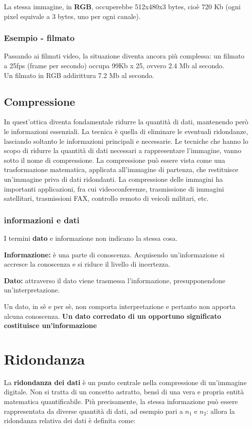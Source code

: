 La stessa immagine, in \textbf{RGB}, occuperebbe 512x480x3 bytes, cioè 720 Kb (ogni pixel equivale a 3 bytes, uno per ogni canale).

\subsubsection*{Esempio - filmato}
Passando ai filmati video, la situazione diventa ancora più complessa: un filmato a 25fps (frame per secondo) occupa 99Kb x 25, ovvero 2.4 Mb al secondo.
\\Un filmato in RGB addirittura 7.2 Mb al secondo.

\subsection{Compressione}
In quest'ottica diventa fondamentale ridurre la quantità di dati, mantenendo però le informazioni essenziali. La tecnica è quella di
eliminare le eventuali ridondanze, lasciando soltanto le informazioni principali e necessarie.
Le tecniche che hanno lo scopo di ridurre la quantità di dati necessari a rappresentare l'immagine, vanno sotto il nome di compressione. La compressione può essere vista come una trasformazione matematica, applicata all'immagine di partenza,
che restituisce un'immagine priva di dati ridondanti. La compressione delle immagini ha importanti applicazioni, fra cui videoconferenze, trasmissione di immagini satellitari, trasmissioni FAX, controllo remoto di veicoli militari, etc.

\subsubsection{informazioni e dati}
I termini \textbf{dato} e informazione non indicano la stessa cosa.
\begin{trivlist}
    \item \textbf{Informazione:} è una parte di conoscenza.
    Acquisendo un'informazione si accresce la conoscenza e si riduce
    il livello di incertezza.
    \item \textbf{Dato: }attraverso il dato viene trasmessa l'informazione,
    presupponendone un'interpretazione.
\end{trivlist}
Un dato, in sè e per sè, non comporta interpretazione e pertanto
non apporta alcuna conoscenza.
\textbf{Un dato corredato di un opportuno significato costituisce un'informazione}

\section{Ridondanza}
La \textbf{ridondanza dei dati} è un punto centrale nella compressione di un'immagine digitale. Non si tratta di un concetto astratto, bensì di una vera e propria entità matematica quantificabile.
Più precisamente, la stessa informazione può essere rappresentata da diverse quantità di dati, ad esempio pari a $n_1$ e $n_2$: allora la
ridondanza relativa dei dati è definita come:

